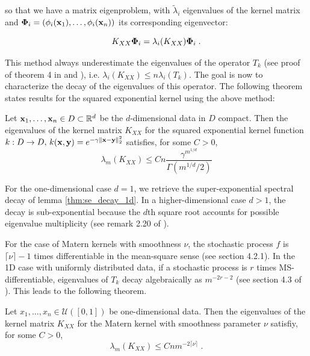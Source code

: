 \documentclass{article}
\begin{document}
{so that we have a matrix eigenproblem, with $\tilde \lambda_i$ eigenvalues of the kernel matrix and $\boldsymbol{\mathbf{\Phi}}_i = (\phi_i(\boldsymbol{\mathbf{x}}_1), \ldots, \phi_i(\boldsymbol{\mathbf{x}}_n))$ its corresponding eigenvector:

\begin{equation*}
    K_{XX} \boldsymbol{\mathbf{\Phi}}_i = \lambda_i(K_{XX}) \boldsymbol{\mathbf{\Phi}}_i \; .
\end{equation*}

This method always underestimate the eigenvalues of the operator $T_k$ (see proof of theorem 4 in \cite{banerjee_parallel_2013} and \cite{baker_numerical_1977}), i.e. $ \lambda_i(K_{XX}) \le n \lambda_i(T_k)$. The goal is now to characterize the decay of the eigenvalues of this operator. The following theorem states results for the squared exponential kernel using the above method:

\begin{theorem}
Let $\boldsymbol{\mathbf{x}}_1, \ldots, \boldsymbol{\mathbf{x}}_n \in D \subset \mathbb R^d$ be the $d$-dimensional data in $D$ compact. Then the eigenvalues of the kernel matrix $K_{XX}$ for the squared exponential kernel function $k: D \to D, \, k(\boldsymbol{\mathbf{x}}, \boldsymbol{\mathbf{y}}) = e^{-\gamma \Vert \boldsymbol{\mathbf{x}} - \boldsymbol{\mathbf{y}} \Vert_2^2}$ satisfies, for some $C > 0$,
\begin{equation*}
    \lambda_m(K_{XX}) \le C n \frac{\gamma^{m^{1/d}}}{\Gamma(m^{1/d}/2)}
\end{equation*}
\end{theorem}

For the one-dimensional case $d=1$, we retrieve the super-exponential spectral decay of lemma \ref{thm:se_decay_1d}. In a higher-dimensional case $d>1$, the decay is sub-exponential because the $d$th square root accounts for possible eigenvalue multiplicity (see remark 2.20 of \cite{schwab_karhunenloeve_2006}).


For the case of Matern kernels with smoothness $\nu$, the stochastic process $f$ is $\lceil \nu \rceil -1$ times differentiable in the mean-square sense (see \cite{rasmussen_gaussian_2005} section 4.2.1). In the 1D case with uniformly distributed data, if a stochastic process is $r$ times MS-differentiable, eigenvalues of $T_k$  decay algebraically as $m^{-2r - 2}$ (see section 4.3 of \cite{rasmussen_gaussian_2005}). This leads to the following theorem. 

\begin{theorem} \label{thm:matern_1d_uniform}
Let $x_1, \ldots, x_n \in \mathcal U([0, 1])$ be one-dimensional data. Then the eigenvalues of the kernel matrix $K_{XX}$ for the Matern kernel with smoothness parameter $\nu$ satisfiy, for some $C > 0$,
\begin{equation*}
    \lambda_m(K_{XX}) \le C n m^{-2\lceil \nu \rceil} \; .
\end{equation*}
\end{theorem}

}
\end{document}
